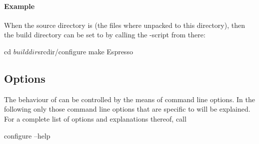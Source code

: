 \paragraph{Example}
When the source directory is  (\ie the files where
unpacked to this directory), then the build directory can be set to
 by calling the -script from
there:
\begin{code}
cd $builddir
$srcdir/configure
make
Espresso
\end{code}

\subsection{Options}
\label{ssec:configureoptions}

 The behaviour of  can be
controlled by the means of command line options.  In the following
only those command line options that are specific to \es will be
explained.  For a complete list of options and explanations thereof,
call
\begin{code}
configure --help
\end{code}

